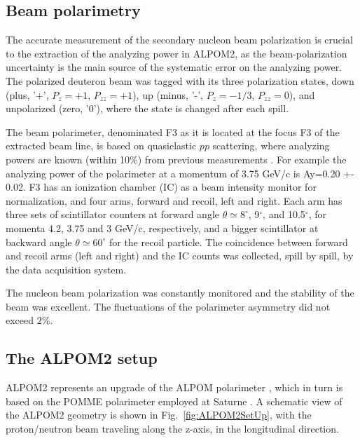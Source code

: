 \documentclass[twocolumn,epjc3]{svjour3}
\begin{document}
\subsection{Beam polarimetry}
The accurate measurement of the secondary nucleon beam polarization is crucial to the extraction of the analyzing power in ALPOM2, as the beam-polarization uncertainty is the main source of the systematic error on the analyzing power. The polarized deuteron beam was tagged with its three polarization states, down (plus, '+', $P_z=+1$, $P_{zz}=+1$), up (minus, '-', $P_z=-1/3$, $P_{zz}=0$), and unpolarized (zero, '0'), where the state is changed after each spill.

The beam polarimeter, denominated F3 as it is located at the focus F3 of the extracted beam line, is based on quasielastic $pp$ scattering, where analyzing powers are known (within 10\%) from previous measurements \cite{Bystricky:1981}. For example the analyzing power of the polarimeter at a momentum of 3.75 GeV/c is Ay=0.20 +- 0.02. F3 has an ionization chamber (IC) as a beam intensity monitor for normalization, and four arms, forward and recoil, left and right. Each arm has three sets of scintillator counters at forward angle $\theta \simeq 8^\circ$, 9$^\circ$, and 10.5$^\circ$, for momenta 4.2, 3.75 and 3 GeV/c, respectively, and a bigger scintillator at backward angle $\theta \simeq 60^\circ$ for the recoil particle. The coincidence between forward and recoil arms (left and right) and the IC counts was collected, spill by spill, by the data acquisition system.

The nucleon beam polarization was constantly monitored and the stability of the beam was excellent. The fluctuations of the polarimeter asymmetry did not exceed $2\%$.

\subsection{The ALPOM2 setup}
ALPOM2 represents an upgrade of the ALPOM polarimeter \cite{Azhgirey:2004yk}, which in turn is based on the POMME polarimeter employed at Saturne \cite{Bonin:1989tg}. A schematic view of the ALPOM2 geometry is shown in Fig.~\ref{fig:ALPOM2SetUp}, with the proton/neutron beam traveling along the z-axis, in the longitudinal direction.
\end{document}
